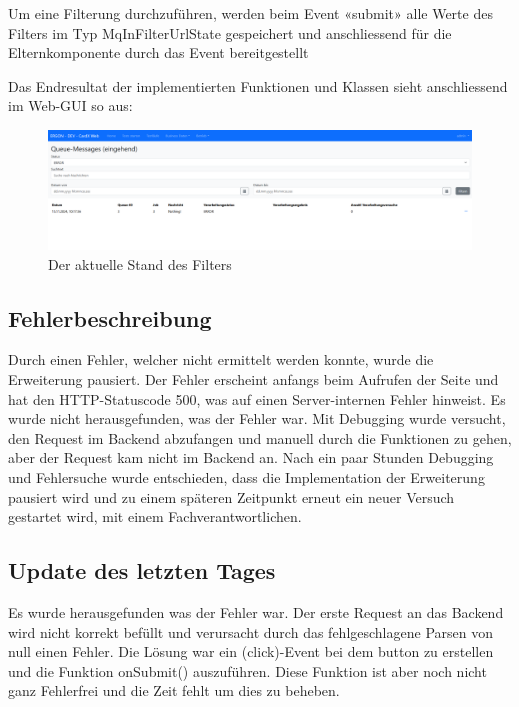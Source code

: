 Um eine Filterung durchzuführen, werden beim Event «submit» alle Werte des Filters im Typ MqInFilterUrlState gespeichert und anschliessend für die Elternkomponente durch das Event bereitgestellt

Das Endresultat der implementierten Funktionen und Klassen sieht anschliessend im Web-GUI so aus:

\begin{figure}[H]
	\begin{center}
		\includegraphics[width=1\textwidth]{ressourcen/Filterung}
		\caption[Der aktuelle Stand des Filters]{Der aktuelle Stand des Filters}\label{fig:filtering-v1}
	\end{center}
\end{figure}

\subsection{Fehlerbeschreibung}
Durch einen Fehler, welcher nicht ermittelt werden konnte, wurde die Erweiterung pausiert. Der Fehler erscheint anfangs beim Aufrufen der Seite und hat den HTTP-Statuscode 500, was auf einen Server-internen Fehler hinweist. Es wurde nicht herausgefunden, was der Fehler war. Mit Debugging wurde versucht, den Request im Backend abzufangen und manuell durch die Funktionen zu gehen, aber der Request kam nicht im Backend an. Nach ein paar Stunden Debugging und Fehlersuche wurde entschieden, dass die Implementation der Erweiterung pausiert wird und zu einem späteren Zeitpunkt erneut ein neuer Versuch gestartet wird, mit einem Fachverantwortlichen.

\subsection{Update des letzten Tages}
Es wurde herausgefunden was der Fehler war. Der erste Request an das Backend wird nicht korrekt befüllt und verursacht durch das fehlgeschlagene Parsen von null einen Fehler. Die Lösung war ein (click)-Event bei dem button zu erstellen und die Funktion onSubmit() auszuführen. Diese Funktion ist aber noch nicht ganz Fehlerfrei und die Zeit fehlt um dies zu beheben.

